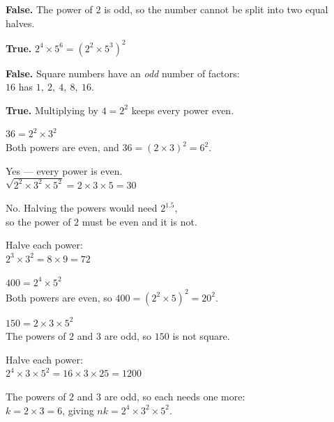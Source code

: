 \documentclass[aspectratio=169]{beamer}
\begin{document}
  {\textbf{False.} The power of $2$ is odd,
   so the number cannot be split into two equal halves.}

  {\textbf{True.} $2^4\times 5^6=\left(2^2\times 5^3\right)^2$}

  {\textbf{False.} Square numbers have an \emph{odd} number of factors:\\[0.3em]
   $16$ has $1,\ 2,\ 4,\ 8,\ 16$.}

  {\textbf{True.} Multiplying by $4=2^2$ keeps every power even.}

  {$36=2^2\times 3^2$\\[0.3em]
   Both powers are even, and $36=(2\times 3)^2=6^2$.}

  {Yes --- every power is even.\\[0.3em]
   $\sqrt{2^2\times 3^2\times 5^2}=2\times 3\times 5=30$}

  {No. Halving the powers would need $2^{1.5}$,\\[0.3em]
   so the power of $2$ must be even and it is not.}

  {Halve each power:\\[0.3em]
   $2^3\times 3^2=8\times 9=72$}

  {$400=2^4\times 5^2$\\[0.3em]
   Both powers are even, so $400=\left(2^2\times 5\right)^2=20^2$.}

  {$150=2\times 3\times 5^2$\\[0.3em]
   The powers of $2$ and $3$ are odd, so $150$ is not square.}

  {Halve each power:\\[0.3em]
   $2^4\times 3\times 5^2=16\times 3\times 25=1200$}

  {The powers of $2$ and $3$ are odd, so each needs one more:\\[0.3em]
   $k=2\times 3=6$, giving $nk=2^4\times 3^2\times 5^2$.}
\end{document}
